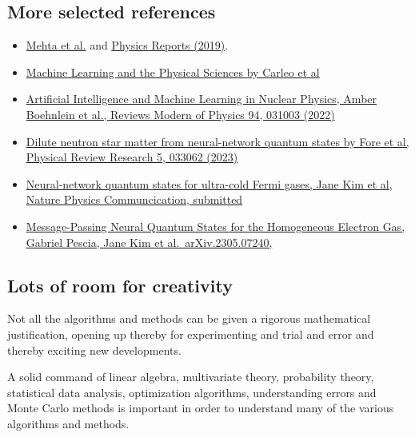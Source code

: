 \documentclass[%
oneside,                 %
final,                   %
10pt]{article}
\begin{document}
\subsection{More selected references}
\begin{block}{}
\begin{itemize}
\item \href{{https://arxiv.org/abs/1803.08823}}{Mehta et al.} and \href{{https://www.sciencedirect.com/science/article/pii/S0370157319300766?via%3Dihub}}{Physics Reports (2019)}.

\item \href{{https://link.aps.org/doi/10.1103/RevModPhys.91.045002}}{Machine Learning and the Physical Sciences by Carleo et al}

\item \href{{https://journals.aps.org/rmp/abstract/10.1103/RevModPhys.94.031003}}{Artificial Intelligence and Machine Learning in Nuclear Physics, Amber Boehnlein et al., Reviews Modern of Physics 94, 031003 (2022)} 

\item \href{{https://journals.aps.org/prresearch/pdf/10.1103/PhysRevResearch.5.033062}}{Dilute neutron star matter from neural-network quantum states by Fore et al, Physical Review Research 5, 033062 (2023)}

\item \href{{https://doi.org/10.48550/arXiv.2305.08831}}{Neural-network quantum states for ultra-cold Fermi gases, Jane Kim et al, Nature Physics Communcication, submitted}

\item \href{{https://doi.org/10.48550/arXiv.2305.07240}}{Message-Passing Neural Quantum States for the Homogeneous Electron Gas, Gabriel Pescia, Jane Kim et al.~arXiv.2305.07240,}
\end{itemize}

\noindent
\end{block}

\subsection{Lots of room for creativity}
\begin{block}{}
Not all the
algorithms and methods can be given a rigorous mathematical
justification, opening up thereby for experimenting
and trial and error and thereby exciting new developments. 
\end{block}

\begin{block}{}
A solid command of linear algebra, multivariate theory, 
probability theory, statistical data analysis, optimization algorithms, 
understanding errors and Monte Carlo methods is important in order to understand many of the 
various algorithms and methods. 
\end{block}
\end{document}
